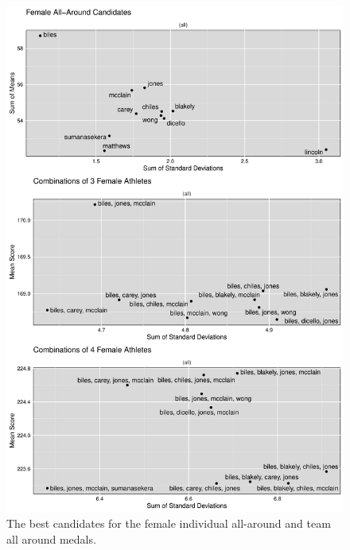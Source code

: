 \documentclass[12pt]{article}
\begin{document}
\begin{figure}
  \centering
  \includegraphics[scale=0.55]{FinalFemaleAllAroundPlot.pdf}
  \caption{The best candidates for the female individual all-around and team all around medals.}
  \label{fig:FAA}
\end{figure}
\end{document}
